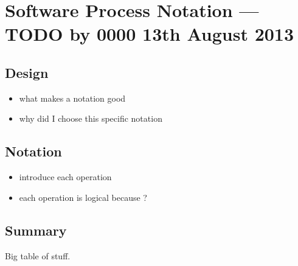\section{Software Process Notation --- TODO by 0000 13th August 2013}

\subsection{Design}

\begin{itemize}
	\item what makes a notation good
	\item why did I choose this specific notation
\end{itemize}

\subsection{Notation}

\begin{itemize}
	\item introduce each operation
	\item each operation is logical because ?
\end{itemize}

\subsection{Summary}

Big table of stuff.
